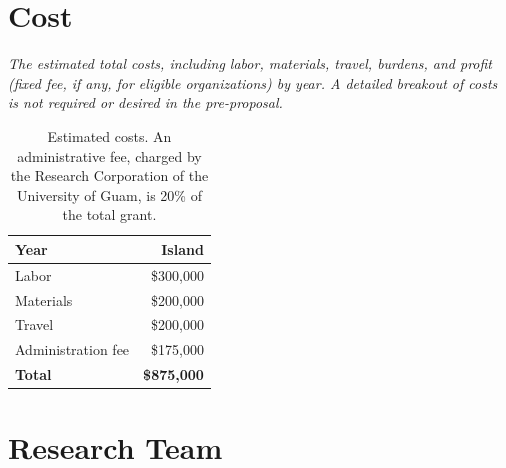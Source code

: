 \documentclass[11pt,english,letterpaper]{scrartcl}
\begin{document}
{
}

\clearpage
\section{Cost}

\textit{The estimated total costs, including labor, materials, travel, burdens, and profit	(fixed fee, if any, for eligible organizations) by year. A detailed breakout of costs is not	required or desired in the pre-proposal.}\\

\begin{table}[H]
	\centering
	\caption{Estimated costs. An administrative fee, charged by the Research Corporation of the University of Guam, is 20\% of the total grant.}	
	
	\begin{tabular}{lr}
		\toprule
		\textbf{Year} & \textbf{Island} \\ \midrule
		Labor & \$300,000 \\			
		Materials & \$200,000 \\
		Travel & \$200,000 \\
		Administration fee & \$175,000 \\	\midrule
		\textbf{Total} & \textbf{\$875,000}
	\end{tabular}
	\label{tbl:north}	
\end{table}

\section{Research Team}
\end{document}
